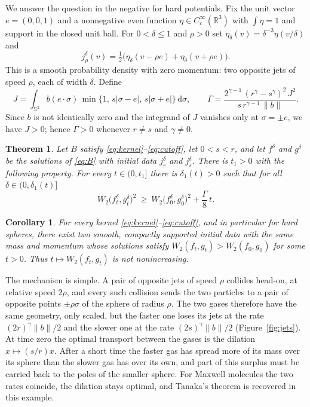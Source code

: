 \documentclass[11pt]{amsart}
\newtheorem{corollary}[theorem]{Corollary}
\newtheorem{mainthm}{Theorem}
\theoremstyle{definition}
\newcommand{\RR}{\mathbb{R}}
\newcommand{\Sph}{\mathbb{S}}
\newcommand{\dd}{\,\mathrm{d}}
\newcommand{\nb}{\|b\|}
\begin{document}
We answer the question in the negative for hard potentials. Fix the unit vector $e=(0,0,1)$ and a nonnegative even function $\eta\in C_c^\infty(\RR^3)$ with $\int\eta=1$ and support in the closed unit ball. For $0<\delta\le1$ and $\rho>0$ set $\eta_\delta(v)=\delta^{-3}\eta(v/\delta)$ and
\begin{equation}\label{eq:data}
j^\delta_\rho(v)=\tfrac12\big(\eta_\delta(v-\rho e)+\eta_\delta(v+\rho e)\big).
\end{equation}
This is a smooth probability density with zero momentum: two opposite jets of speed $\rho$, each of width $\delta$. Define
\begin{equation}\label{eq:J}
J=\int_{\Sph^2}b(e\cdot\sigma)\,\min\{1,\,s|\sigma-e|,\,s|\sigma+e|\}\dd\sigma ,
\qquad
\Gamma=\frac{2^{\gamma-1}\,(r^\gamma-s^\gamma)^2\,J^2}{s\,r^{\gamma-1}\,\nb}.
\end{equation}
Since $b$ is not identically zero and the integrand of $J$ vanishes only at $\sigma=\pm e$, we have $J>0$; hence $\Gamma>0$ whenever $r\neq s$ and $\gamma\ne0$.

\begin{mainthm}\label{thm:A}
Let $B$ satisfy \eqref{eq:kernel}--\eqref{eq:cutoff}, let $0<s<r$, and let $f^\delta$ and $g^\delta$ be the solutions of \eqref{eq:B} with initial data $j^\delta_r$ and $j^\delta_s$. There is $t_1>0$ with the following property. For every $t\in(0,t_1]$ there is $\delta_1(t)>0$ such that for all $\delta\in(0,\delta_1(t)]$
\[
W_2\big(f^\delta_t,g^\delta_t\big)^2\ \ge\ W_2\big(f^\delta_0,g^\delta_0\big)^2+\frac{\Gamma}{8}\,t .
\]
\end{mainthm}

\begin{corollary}\label{cor:no}
For every kernel \eqref{eq:kernel}--\eqref{eq:cutoff}, and in particular for hard spheres, there exist two smooth, compactly supported initial data with the same mass and momentum whose solutions satisfy $W_2(f_t,g_t)>W_2(f_0,g_0)$ for some $t>0$. Thus $t\mapsto W_2(f_t,g_t)$ is not nonincreasing.
\end{corollary}

The mechanism is simple. A pair of opposite jets of speed $\rho$ collides head-on, at relative speed $2\rho$, and every such collision sends the two particles to a pair of opposite points $\pm\rho\sigma$ of the sphere of radius $\rho$. The two gases therefore have the same geometry, only scaled, but the faster one loses its jets at the rate $(2r)^\gamma\nb/2$ and the slower one at the rate $(2s)^\gamma\nb/2$ (Figure~\ref{fig:jets}). At time zero the optimal transport between the gases is the dilation $x\mapsto(s/r)x$. After a short time the faster gas has spread more of its mass over its sphere than the slower gas has over its own, and part of this surplus must be carried back to the poles of the smaller sphere. For Maxwell molecules the two rates coincide, the dilation stays optimal, and Tanaka's theorem is recovered in this example.
\end{document}
